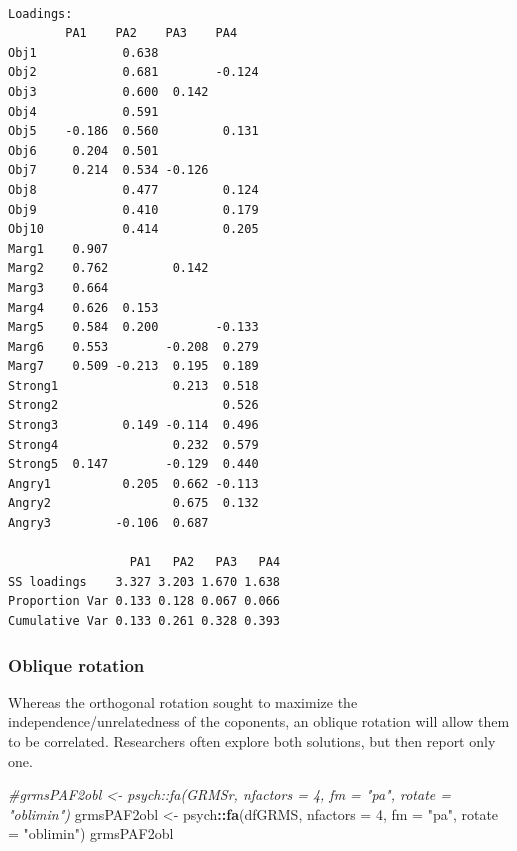 \documentclass[
  english,
]{book}
\newenvironment{Shaded}{\begin{snugshade}}{\end{snugshade}}
\newcommand{\CommentTok}[1]{\textcolor[rgb]{0.56,0.35,0.01}{\textit{#1}}}
\newcommand{\DataTypeTok}[1]{\textcolor[rgb]{0.13,0.29,0.53}{#1}}
\newcommand{\DecValTok}[1]{\textcolor[rgb]{0.00,0.00,0.81}{#1}}
\newcommand{\KeywordTok}[1]{\textcolor[rgb]{0.13,0.29,0.53}{\textbf{#1}}}
\newcommand{\NormalTok}[1]{#1}
\newcommand{\OperatorTok}[1]{\textcolor[rgb]{0.81,0.36,0.00}{\textbf{#1}}}
\newcommand{\StringTok}[1]{\textcolor[rgb]{0.31,0.60,0.02}{#1}}
\begin{document}
\begin{verbatim}

Loadings:
        PA1    PA2    PA3    PA4   
Obj1            0.638              
Obj2            0.681        -0.124
Obj3            0.600  0.142       
Obj4            0.591              
Obj5    -0.186  0.560         0.131
Obj6     0.204  0.501              
Obj7     0.214  0.534 -0.126       
Obj8            0.477         0.124
Obj9            0.410         0.179
Obj10           0.414         0.205
Marg1    0.907                     
Marg2    0.762         0.142       
Marg3    0.664                     
Marg4    0.626  0.153              
Marg5    0.584  0.200        -0.133
Marg6    0.553        -0.208  0.279
Marg7    0.509 -0.213  0.195  0.189
Strong1                0.213  0.518
Strong2                       0.526
Strong3         0.149 -0.114  0.496
Strong4                0.232  0.579
Strong5  0.147        -0.129  0.440
Angry1          0.205  0.662 -0.113
Angry2                 0.675  0.132
Angry3         -0.106  0.687       

                 PA1   PA2   PA3   PA4
SS loadings    3.327 3.203 1.670 1.638
Proportion Var 0.133 0.128 0.067 0.066
Cumulative Var 0.133 0.261 0.328 0.393
\end{verbatim}

\hypertarget{oblique-rotation-1}{%
\subsubsection{Oblique rotation}\label{oblique-rotation-1}}

Whereas the orthogonal rotation sought to maximize the independence/unrelatedness of the coponents, an oblique rotation will allow them to be correlated. Researchers often explore both solutions, but then report only one.

\begin{Shaded}
\begin{Highlighting}[]
\CommentTok{#grmsPAF2obl <- psych::fa(GRMSr, nfactors = 4, fm = "pa", rotate = "oblimin")}
\NormalTok{grmsPAF2obl <-}\StringTok{ }\NormalTok{psych}\OperatorTok{::}\KeywordTok{fa}\NormalTok{(dfGRMS, }\DataTypeTok{nfactors =} \DecValTok{4}\NormalTok{, }\DataTypeTok{fm =} \StringTok{"pa"}\NormalTok{, }\DataTypeTok{rotate =} \StringTok{"oblimin"}\NormalTok{)}
\NormalTok{grmsPAF2obl}
\end{Highlighting}
\end{Shaded}
\end{document}
